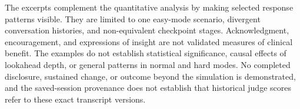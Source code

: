 The excerpts complement the quantitative analysis by making selected response patterns visible. They are limited to one easy-mode scenario, divergent conversation histories, and non-equivalent checkpoint stages. Acknowledgment, encouragement, and expressions of insight are not validated measures of clinical benefit. The examples do not establish statistical significance, causal effects of lookahead depth, or general patterns in normal and hard modes. No completed disclosure, sustained change, or outcome beyond the simulation is demonstrated, and the saved-session provenance does not establish that historical judge scores refer to these exact transcript versions.
